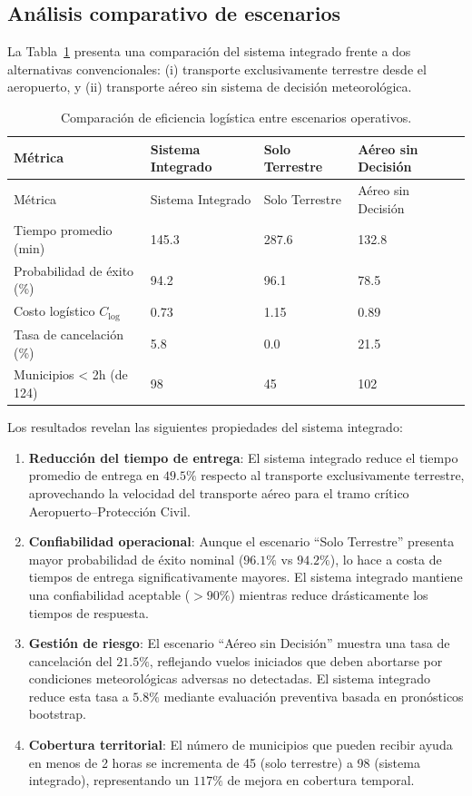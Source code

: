 \documentclass[
  spanish,
  us-letterpaper,
]{scrreprt}
\numberwithin{equation}{section}
\begin{document}
\subsection{Análisis comparativo de
escenarios}\label{anuxe1lisis-comparativo-de-escenarios}

La Tabla~\ref{tbl-eficiencia-escenarios} presenta una comparación del
sistema integrado frente a dos alternativas convencionales: (i)
transporte exclusivamente terrestre desde el aeropuerto, y (ii)
transporte aéreo sin sistema de decisión meteorológica.

\begin{longtable}[]{@{}llll@{}}
\caption{Comparación de eficiencia logística entre escenarios
operativos.}\label{tbl-eficiencia-escenarios}\tabularnewline
\toprule\noalign{}
Métrica & Sistema Integrado & Solo Terrestre & Aéreo sin Decisión \\
\midrule\noalign{}
\endfirsthead
\toprule\noalign{}
Métrica & Sistema Integrado & Solo Terrestre & Aéreo sin Decisión \\
\midrule\noalign{}
\endhead
\bottomrule\noalign{}
\endlastfoot
Tiempo promedio (min) & 145.3 & 287.6 & 132.8 \\
Probabilidad de éxito (\%) & 94.2 & 96.1 & 78.5 \\
Costo logístico \(C_{\text{log}}\) & 0.73 & 1.15 & 0.89 \\
Tasa de cancelación (\%) & 5.8 & 0.0 & 21.5 \\
Municipios \textless{} 2h (de 124) & 98 & 45 & 102 \\
\end{longtable}

Los resultados revelan las siguientes propiedades del sistema integrado:

\begin{enumerate}
\def\labelenumi{\arabic{enumi}.}
\item
  \textbf{Reducción del tiempo de entrega}: El sistema integrado reduce
  el tiempo promedio de entrega en \(49.5\%\) respecto al transporte
  exclusivamente terrestre, aprovechando la velocidad del transporte
  aéreo para el tramo crítico Aeropuerto--Protección Civil.
\item
  \textbf{Confiabilidad operacional}: Aunque el escenario ``Solo
  Terrestre'' presenta mayor probabilidad de éxito nominal (\(96.1\%\)
  vs \(94.2\%\)), lo hace a costa de tiempos de entrega
  significativamente mayores. El sistema integrado mantiene una
  confiabilidad aceptable (\(>90\%\)) mientras reduce drásticamente los
  tiempos de respuesta.
\item
  \textbf{Gestión de riesgo}: El escenario ``Aéreo sin Decisión''
  muestra una tasa de cancelación del \(21.5\%\), reflejando vuelos
  iniciados que deben abortarse por condiciones meteorológicas adversas
  no detectadas. El sistema integrado reduce esta tasa a \(5.8\%\)
  mediante evaluación preventiva basada en pronósticos bootstrap.
\item
  \textbf{Cobertura territorial}: El número de municipios que pueden
  recibir ayuda en menos de 2 horas se incrementa de 45 (solo terrestre)
  a 98 (sistema integrado), representando un \(117\%\) de mejora en
  cobertura temporal.
\end{enumerate}
\end{document}
